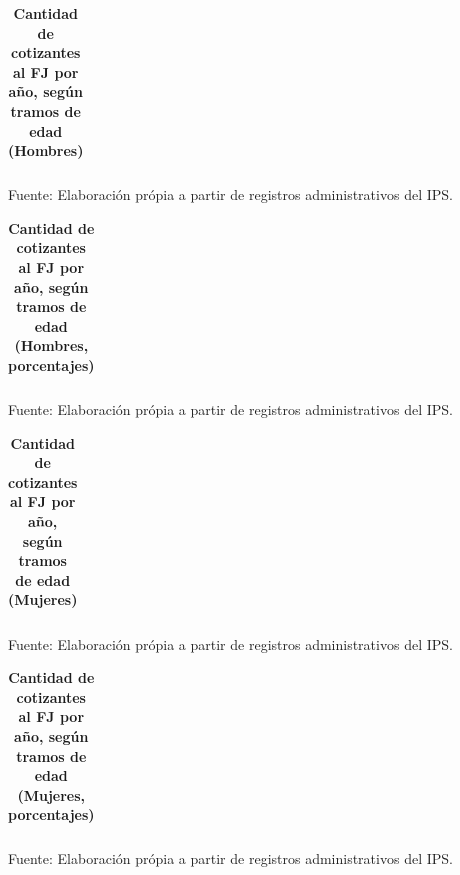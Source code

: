 \begin{table}[H]
\begin{center}
\scriptsize     
\caption{\bf{Cantidad de cotizantes al FJ por año, según tramos de edad (Hombres)}}
\begin{tabular}{l|rrrrrrrrrrrrr}

\end{tabular}
                    \item Fuente: Elaboración própia a partir de registros administrativos del IPS.
\end{center}
\end{table}

\begin{table}[H]
\begin{center}
\scriptsize     
\caption{\bf{Cantidad de cotizantes al FJ por año, según tramos de edad (Hombres, porcentajes)}}
\begin{tabular}{l|rrrrrrrrrrrrr}

\end{tabular}
                    \item Fuente: Elaboración própia a partir de registros administrativos del IPS.
\end{center}
\end{table}

\begin{table}[H]
\begin{center}
\scriptsize     
\caption{\bf{Cantidad de cotizantes al FJ por año, según tramos de edad (Mujeres)}}
\begin{tabular}{l|rrrrrrrrrrrrr}

\end{tabular}
                    \item Fuente: Elaboración própia a partir de registros administrativos del IPS.
\end{center}
\end{table}

\begin{table}[H]
\begin{center}
\scriptsize     
\caption{\bf{Cantidad de cotizantes al FJ por año, según tramos de edad (Mujeres, porcentajes)}}
\begin{tabular}{l|rrrrrrrrrrrrr}

\end{tabular}
                    \item Fuente: Elaboración própia a partir de registros administrativos del IPS.
\end{center}
\end{table}

